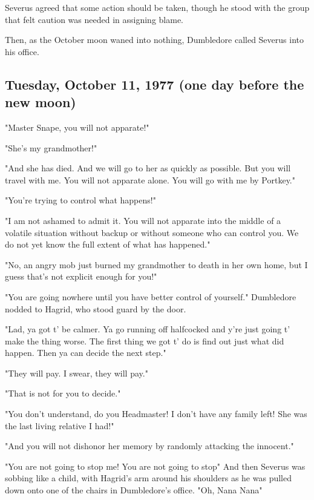 Severus agreed that some action should be taken, though he stood with the group that felt caution was needed in assigning blame.

Then, as the October moon waned into nothing, Dumbledore called Severus into his office.


\subsection{Tuesday, October 11, 1977 (one day before the new moon)}

"Master Snape, you will not apparate!"

"She's my grandmother!"

"And she has died. And we will go to her as quickly as possible. But you will travel with me. You will not apparate alone. You will go with me by Portkey."

"You're trying to control what happens!"

"I am not ashamed to admit it. You will not apparate into the middle of a volatile situation without backup or without someone who can control you. We do not yet know the full extent of what has happened."

"No, an angry mob just burned my grandmother to death in her own home, but I guess that's not explicit enough for you!"

"You are going nowhere until you have better control of yourself." Dumbledore nodded to Hagrid, who stood guard by the door.

"Lad, ya got t' be calmer. Ya go running off halfcocked and y're just going t' make the thing worse. The first thing we got t' do is find out just what did happen. Then ya can decide the next step."

"They will pay. I swear, they will pay."

"That is not for you to decide."

"You don't understand, do you Headmaster! I don't have any family left! She was the last living relative I had!"

"And you will not dishonor her memory by randomly attacking the innocent."

"You are not going to stop me! You are not{\el} going to{\el} stop{\el}" And then Severus was sobbing like a child, with Hagrid's arm around his shoulders as he was pulled down onto one of the chairs in Dumbledore's office. "Oh, Nana{\el} Nana{\el}"

